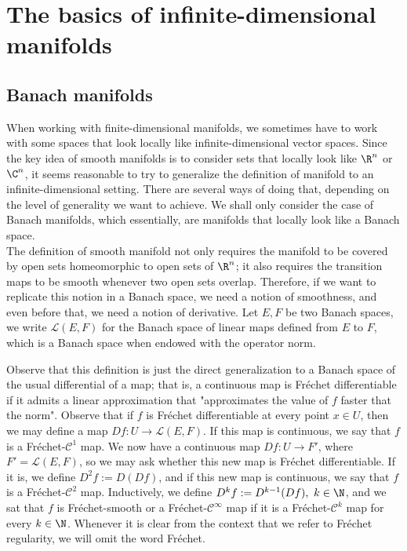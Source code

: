 \chapter{The basics of infinite-dimensional manifolds} \label{chapter_inf_dim_sympl_red}
\section{Banach manifolds}
When working with finite-dimensional manifolds, we sometimes have to work with some spaces that look locally like infinite-dimensional vector spaces. Since the key idea of smooth manifolds is to consider sets that locally look like \(\R^n\) or \(\C^n\), it seems reasonable to try to generalize the definition of manifold to an infinite-dimensional setting. There are several ways of doing that, depending on the level of generality we want to achieve. We shall only consider the case of Banach manifolds, which essentially, are manifolds that locally look like a Banach space. \\

The definition of smooth manifold not only requires the manifold to be covered by open sets homeomorphic to open sets of \(\R^n\); it also requires the transition maps to be smooth whenever two open sets overlap. Therefore, if we want to replicate this notion in a Banach space, we need a notion of smoothness, and even before that, we need a notion of derivative. Let \(E,F\) be two Banach spaces, we write \(\mathcal{L}(E,F)\) for the Banach space of linear maps defined from \(E\) to \(F\), which is a Banach space when endowed with the operator norm.

Observe that this definition is just the direct generalization to a Banach space of the usual differential of a map; that is, a continuous map is Fréchet differentiable if it admits a linear approximation that "approximates the value of \(f\) faster that the norm". Observe that if \(f\) is Fréchet differentiable at every point \(x \in U\), then we may define a map \(Df\colon U \to \mathcal{L}(E,F)\). If this map is continuous, we say that \(f\) is a Fréchet-\(\mathscr{C}^1\) map. We now have a continuous map \(Df\colon U \to F'\), where \(F'=\mathcal{L}(E,F)\), so we may ask whether this new map is Fréchet differentiable. If it is, we define \(D^2f:=D(Df)\), and if this new map is continuous, we say that \(f\) is a Fréchet-\(\mathscr{C}^2\) map. Inductively, we define \(D^kf:=D^{k-1}(Df), \ k \in \N\), and we sat that \(f\) is Fréchet-smooth or a Fréchet-\(\mathscr{C}^\infty\) map if it is a Fréchet-\(\mathscr{C}^k\) map for every \(k \in \N\). Whenever it is clear from the context that we refer to Fréchet regularity, we will omit the word Fréchet. 

